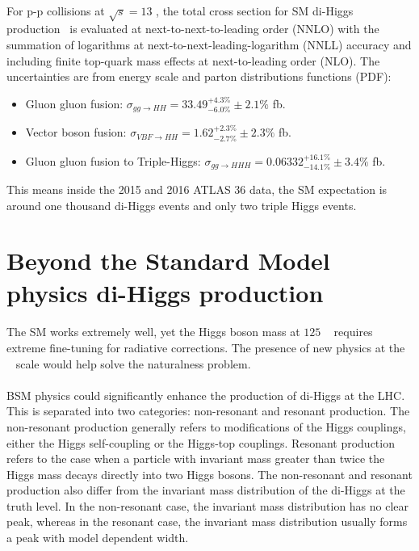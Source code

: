 \paragraph{}
\label{par:diHiggs-crosssection}
For p-p collisions at $\sqrt{s}=13$ \TeV, the total cross section for SM di-Higgs production~\cite{LHCYellow} is evaluated at next-to-next-to-leading order (NNLO) with the summation of logarithms at next-to-next-leading-logarithm (NNLL) accuracy and including finite top-quark mass effects at next-to-leading order (NLO).
The uncertainties are from energy scale and parton distributions functions (PDF):
\begin{itemize}
  \item Gluon gluon fusion: $\sigma_{gg \to HH} = 33.49^{+ 4.3 \%}_{-6.0 \%} \pm 2.1\%$ fb. %
  \item Vector boson fusion: $\sigma_{VBF \to HH} = 1.62^{+ 2.3 \%}_{-2.7 \%} \pm 2.3\%$ fb.
  \item Gluon gluon fusion to Triple-Higgs: $\sigma_{gg \to HHH} = 0.06332 ^{+ 16.1 \%}_{-14.1 \%} \pm 3.4\% $ fb.
\end{itemize}
This means inside the 2015 and 2016 ATLAS 36 \ifb data, the SM expectation is around one thousand di-Higgs events and only two triple Higgs events.



\section{Beyond the Standard Model physics di-Higgs production}
\paragraph{}
The SM works extremely well, yet the Higgs boson mass at $125$ \GeV~ requires extreme fine-tuning for radiative corrections. The presence of new physics at the \TeV~ scale would help solve the naturalness problem.

\paragraph{}
BSM physics could significantly enhance the production of di-Higgs at the LHC. This is separated into two categories: non-resonant and resonant production. 
The non-resonant production generally refers to modifications of the Higgs couplings, either the Higgs self-coupling or the Higgs-top couplings. 
Resonant production refers to the case when a particle with invariant mass greater than twice the Higgs mass decays directly into two Higgs bosons. 
The non-resonant and resonant production also differ from the invariant mass distribution of the di-Higgs at the truth level. 
In the non-resonant case, the invariant mass distribution has no clear peak, whereas in the resonant case, the invariant mass distribution usually forms a peak with model dependent width. 

